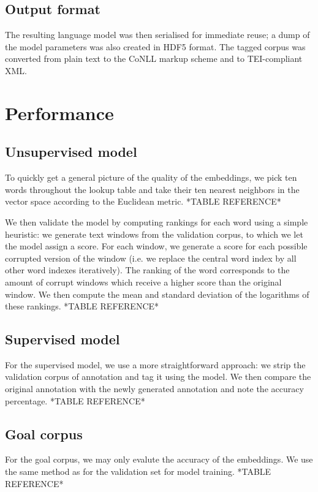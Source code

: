 \subsection{Output format}
\label{sec:output}

The resulting language model was then serialised for immediate reuse;
a dump of the model parameters was also created in HDF5 format. The
tagged corpus was converted from plain text to the CoNLL markup scheme
and to TEI-compliant XML.

\section{Performance}
\label{sec:performance}

\subsection{Unsupervised model}
\label{sec:unsupacc}

To quickly get a general picture of the quality of the embeddings, we
pick ten words throughout the lookup table and take their ten nearest
neighbors in the vector space according to the Euclidean metric. *TABLE REFERENCE*

We then validate the model by computing rankings for each word using a
simple heuristic: we generate text windows from the validation corpus,
to which we let the model assign a score. For each window, we generate
a score for each possible corrupted version of the window (i.e. we
replace the central word index by all other word indexes
iteratively). The ranking of the word corresponds to the amount of
corrupt windows which receive a higher score than the original
window. We then compute the mean and standard deviation of the
logarithms of these rankings. *TABLE REFERENCE*

\subsection{Supervised model}
\label{sec:supacc}
For the supervised model, we use a more straightforward approach: we
strip the validation corpus of annotation and tag it using the
model. We then compare the original annotation with the newly
generated annotation and note the accuracy percentage. *TABLE REFERENCE*

\subsection{Goal corpus}
\label{sec:supacc}
For the goal corpus, we may only evalute the accuracy of the
embeddings. We use the same method as for the validation set for model
training. *TABLE REFERENCE*